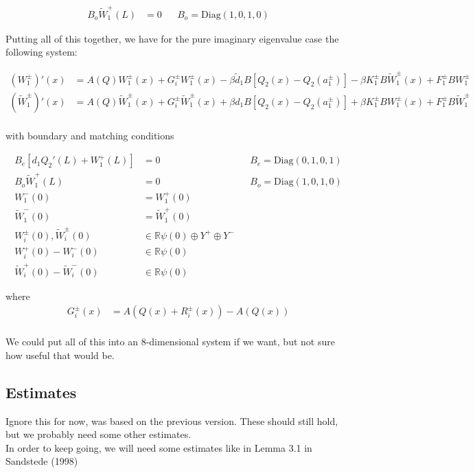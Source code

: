\documentclass[12pt]{article}
\def\R{{\mathbb R}}
\begin{document}
\begin{align*}
B_o \tilde{W}_1^+(L) &= 0  && B_o = \textrm{Diag}(1, 0, 1, 0)
\end{align*}

Putting all of this together, we have for the pure imaginary eigenvalue case the following system:

\begin{align*}
(W_1^\pm)'(x) &= A(Q) W_1^\pm(x) + G_i^\pm W_1^\pm(x) -\beta \tilde{d}_1 B[ Q_2(x) - Q_2(a_1^\pm) ] - \beta K_1^\pm B \tilde{W}_1^\pm(x) + F_1^\pm B W_1^\pm \\
(\tilde{W}_1^\pm)'(x) &= A(Q) \tilde{W}_1^\pm(x) + G_i^\pm \tilde{W}_1^\pm(x) + \beta d_1 B[ Q_2(x) - Q_2(a_1^\pm) ] + \beta K_1^\pm B W_1^\pm(x) + F_1^\pm B \tilde{W}_1^\pm \\
\end{align*}

with boundary and matching conditions

\begin{align*}
B_e [d_1 Q_2'(L) + W_1^+(L)] &= 0  && B_e = \textrm{Diag}(0, 1, 0, 1) \\
B_o \tilde{W}_1^+(L) &= 0  && B_o = \textrm{Diag}(1, 0, 1, 0) \\
W_1^-(0) &= W_1^+(0) \\
\tilde{W}_1^-(0) &= \tilde{W}_1^+(0) \\
W_i^\pm(0), \tilde{W}_i^\pm(0) &\in \R \psi(0) \oplus Y^+ \oplus Y^- \\
W_i^+(0) - W_i^-(0) &\in \R \psi(0)  \\
\tilde{W}_i^+(0) - \tilde{W}_i^-(0) &\in \R \psi(0)
\end{align*}

where
\begin{align*}
G_i^\pm(x) &= A(Q(x) + R_i^\pm(x)) - A(Q(x)) \\
\end{align*}

We could put all of this into an 8-dimensional system if we want, but not sure how useful that would be.


\subsection*{Estimates}
Ignore this for now, was based on the previous version. These should still hold, but we probably need some other estimates. \\

In order to keep going, we will need some estimates like in Lemma 3.1 in Sandstede (1998)
\end{document}

